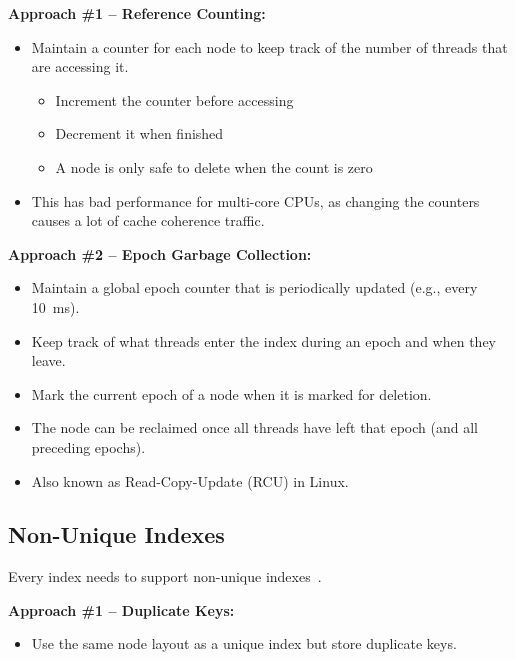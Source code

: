\documentclass[11pt]{article}
\begin{document}
\textbf{Approach \#1 -- Reference Counting:}
\begin{itemize}
    \item
    Maintain a counter for each node to keep track of the number of threads that are 
    accessing it.
    \begin{itemize}
        \item Increment the counter before accessing
        \item Decrement it when finished
        \item A node is only safe to delete when the count is zero
    \end{itemize}
    
    \item
    This has bad performance for multi-core CPUs, as changing the counters causes a 
    lot of cache coherence traffic.
\end{itemize}

\textbf{Approach \#2 -- Epoch Garbage Collection:}
\begin{itemize}
    \item
    Maintain a global epoch counter that is periodically updated (e.g., every 10~ms).
    
    \item
    Keep track of what threads enter the index during an epoch and when they leave.
    
    \item
    Mark the current epoch of a node when it is marked for deletion.
    
    \item
    The node can be reclaimed once all threads have left that epoch (and all 
    preceding epochs).
    
    \item
    Also known as Read-Copy-Update (RCU) in Linux.
\end{itemize}

\subsection*{Non-Unique Indexes}
Every index needs to support non-unique indexes~\cite{p203-graefe}.

\textbf{Approach \#1 -- Duplicate Keys:}
\begin{itemize}
    \item
    Use the same node layout as a unique index but store duplicate keys.
\end{itemize}
\end{document}
